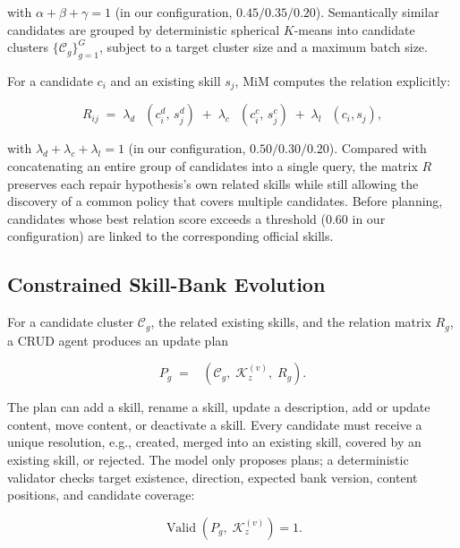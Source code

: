 \documentclass[11pt]{article}
\newcommand{\KK}{\mathcal{K}}
\newcommand{\CC}{\mathcal{C}}
\DeclareMathOperator{\Valid}{Valid}
\DeclareMathOperator{\simsem}{sim_{sem}}
\DeclareMathOperator{\simlex}{sim_{lex}}
\DeclareMathOperator{\Crud}{G_{crud}}
\begin{document}
\noindent with $\alpha + \beta + \gamma = 1$ (in our configuration,
$0.45 / 0.35 / 0.20$). Semantically similar candidates are grouped by
deterministic spherical $K$-means into candidate clusters
$\{\CC_g\}_{g=1}^{G}$, subject to a target cluster size and a maximum batch size.

For a candidate $c_i$ and an existing skill $s_j$, MiM computes the relation
explicitly:

\begin{equation}
\label{eq:relation}
R_{ij} \;=\; \lambda_d\, \simsem\!\left(c_i^{d},\, s_j^{d}\right)
\;+\; \lambda_c\, \simsem\!\left(c_i^{c},\, s_j^{c}\right)
\;+\; \lambda_l\, \simlex(c_i, s_j),
\end{equation}

\noindent with $\lambda_d + \lambda_c + \lambda_l = 1$ (in our configuration,
$0.50 / 0.30 / 0.20$). Compared with concatenating an entire group of candidates
into a single query, the matrix $R$ preserves each repair hypothesis's own
related skills while still allowing the discovery of a common policy that covers
multiple candidates. Before planning, candidates whose best relation score
exceeds a threshold (0.60 in our configuration) are linked to the corresponding
official skills.

\subsection{Constrained Skill-Bank Evolution}
\label{sec:method-evolution}

For a candidate cluster $\CC_g$, the related existing skills, and the relation
matrix $R_g$, a CRUD agent produces an update plan

\begin{equation}
\label{eq:crud}
P_g \;=\; \Crud\left(\CC_g,\; \KK_z^{(v)},\; R_g\right).
\end{equation}

\noindent The plan can add a skill, rename a skill, update a description, add
or update content, move content, or deactivate a skill. Every candidate must
receive a unique resolution, e.g., created, merged into an existing skill,
covered by an existing skill, or rejected. The model only proposes plans; a
deterministic validator checks target existence, direction, expected bank
version, content positions, and candidate coverage:

\begin{equation}
\label{eq:valid}
\Valid(P_g,\; \KK_z^{(v)}) = 1 .
\end{equation}
\end{document}
